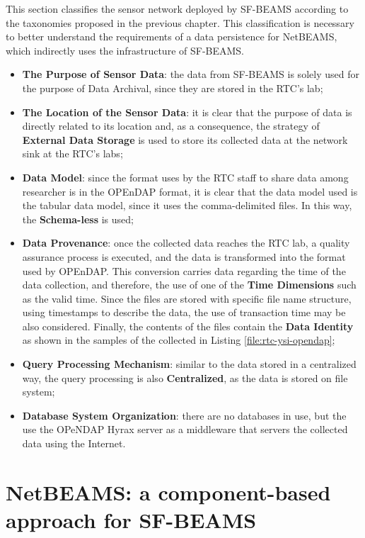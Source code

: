 This section classifies the sensor network deployed by SF-BEAMS according to
the taxonomies proposed in the previous chapter. This classification is
necessary to better understand the requirements of a data persistence for
NetBEAMS, which indirectly uses the infrastructure of SF-BEAMS.

\begin{itemize}
  \item \textbf{The Purpose of Sensor Data}: the data from SF-BEAMS is solely
  used for the purpose of Data Archival, since they are stored in the RTC's
  lab;
  \item \textbf{The Location of the Sensor Data}: it is clear that the purpose
  of data is directly related to its location and, as a consequence, the
  strategy of \textbf{External Data Storage} is used to store its collected
  data at the network sink at the RTC's labs;
  \item \textbf{Data Model}: since the format uses by the RTC staff to share
  data among researcher is in the OPEnDAP format, it is clear that the data
  model used is the tabular data model, since it uses the comma-delimited
  files. In this way, the \textbf{Schema-less} is used;
  \item \textbf{Data Provenance}: once the collected data reaches the RTC
  lab, a quality assurance process is executed, and the data is transformed
  into the format used by OPEnDAP. This conversion carries data regarding
  the time of the data collection, and therefore, the use of one of the
  \textbf{Time Dimensions} such as the valid time. Since the files are stored
  with specific file name structure, using timestamps to describe the data, the
  use of transaction time may be also considered. Finally, the contents of the
  files contain the \textbf{Data Identity} as shown in the samples of
  the collected in Listing \ref{file:rtc-ysi-opendap};
  \item \textbf{Query Processing Mechanism}: similar to the data stored in a
  centralized way, the query processing is also \textbf{Centralized}, as the
  data is stored on file system;
  \item \textbf{Database System Organization}: there are no databases in use,
  but the use the OPeNDAP Hyrax server as a middleware that servers the
  collected data using the Internet.
\end{itemize}

\section{NetBEAMS: a component-based approach for SF-BEAMS}
\label{sec:problem-requirements}

